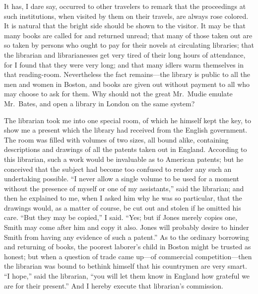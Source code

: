 It has, I dare say, occurred to other travelers to remark that the
proceedings at such institutions, when visited by them on their
travels, are always rose colored.  It is natural that the bright
side should be shown to the visitor.  It may be that many books are
called for and returned unread; that many of those taken out are so
taken by persons who ought to pay for their novels at circulating
libraries; that the librarian and librarianesses get very tired of
their long hours of attendance, for I found that they were very
long; and that many idlers warm themselves in that reading-room.
Nevertheless the fact remains---the library is public to all the men
and women in Boston, and books are given out without payment to all
who may choose to ask for them.  Why should not the great Mr.\ Mudie
emulate Mr.\ Bates, and open a library in London on the same system?

The librarian took me into one special room, of which he himself
kept the key, to show me a present which the library had received
from the English government.  The room was filled with volumes of
two sizes, all bound alike, containing descriptions and drawings of
all the patents taken out in England.  According to this librarian,
such a work would be invaluable as to American patents; but he
conceived that the subject had become too confused to render any
such an undertaking possible.  ``I never allow a single volume to be
used for a moment without the presence of myself or one of my
assistants,'' said the librarian; and then he explained to me, when
I asked him why he was so particular, that the drawings would, as a
matter of course, be cut out and stolen if he omitted his care.
``But they may be copied,'' I said.  ``Yes; but if Jones merely copies
one, Smith may come after him and copy it also.  Jones will
probably desire to hinder Smith from having any evidence of such a
patent.''  As to the ordinary borrowing and returning of books, the
poorest laborer's child in Boston might be trusted as honest; but
when a question of trade came up---of commercial competition---then
the librarian was bound to bethink himself that his countrymen are
very smart.  ``I hope,'' said the librarian, ``you will let them know
in England how grateful we are for their present.''  And I hereby
execute that librarian's commission.

